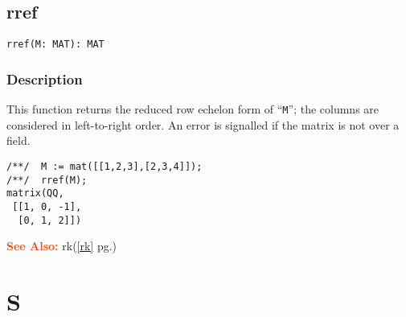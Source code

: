 \documentclass[a4paper]{mybook}
\newenvironment{command}{}{} %
\newcommand\SeeAlso{\par\textcolor{OrangeRed}{\textbf{\large See Also: }}}
\begin{document}
\section{rref}
\label{rref}
\begin{command} %


\begin{Verbatim}[label=syntax, rulecolor=\color{MidnightBlue},
frame=single]
rref(M: MAT): MAT
\end{Verbatim}


\subsection*{Description}

This function returns the reduced row echelon form of ``\verb&M&'';
the columns are considered in left-to-right order.  An error is
signalled if the matrix is not over a field.
\begin{Verbatim}[label=example, rulecolor=\color{PineGreen}, frame=single]
/**/  M := mat([[1,2,3],[2,3,4]]);
/**/  rref(M);
matrix(QQ,
 [[1, 0, -1],
  [0, 1, 2]])
\end{Verbatim}


\SeeAlso %
  rk(\ref{rk} pg.\pageref{rk})
\end{command} %

\chapter{S}  %
\label{S}
\end{document}

